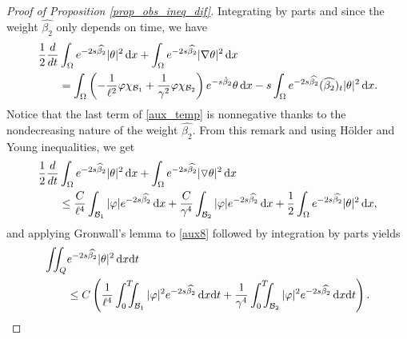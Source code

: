 \documentclass{dcds-bOF}
\theoremstyle{definition}
\newcommand\csin[1]{\chi_{#1}}
\def\dx{\,\textnormal{d}x}
\def\dt{\textnormal{d}t}
\begin{document}
\begin{proof}[Proof of Proposition \ref{prop_obs_ineq_dif}]
Integrating by parts and since the weight $\widehat{\beta_2}$ only depends on time, we have
%
\begin{equation}
\label{aux_temp}
\begin{split}
\frac12\frac{d}{dt}&\int_{\Omega}e^{-2s\widehat{\beta_2}}|\theta|^2\dx+\int_{\Omega}e^{-2s\widehat{\beta_2}}|\nabla \theta|^2\dx\\
&=\int_{\Omega}\left(-\frac{1}{\ell^2}\varphi\csin{\mathcal B_1}+\frac{1}{\gamma^2}\varphi \csin{\mathcal B_2}\right)e^{-s\hat{\beta}_2}\theta\dx-s\int_{\Omega}e^{-2s\widehat{\beta_2}}(\widehat{\beta_2})_t|\theta|^2\dx.
\end{split}
\end{equation}
%
 Notice that the last term of \eqref{aux_temp} is nonnegative thanks to the nondecreasing nature of the weight $\widehat{\beta_2}$. From this remark and using H\"older and Young inequalities, we get
 \begin{equation}
\label{aux8}
\begin{split}
\frac12\frac{d}{dt}&\int_{\Omega}e^{-2s\widehat{\beta}_2}|\theta|^2\dx+\int_{\Omega}e^{-2s\widehat{\beta_2}}|\triangledown \theta|^2\dx\\
&\leq \frac{C}{\ell^4}\int_{\mathcal B_1}|\varphi|e^{-2s\widehat{\beta_2}}\dx+\frac{C}{\gamma^4}\int_{\mathcal B_2}|\varphi|e^{-2s\widehat{\beta_2}}\dx+\frac12\int_{\Omega}e^{-2s\widehat{\beta_2}}|\theta|^2\dx,
\end{split}
\end{equation}
and applying Gronwall's lemma to \eqref{aux8} followed by integration by parts yields
 \begin{equation}\label{aux9}
 \begin{split}
\iint_Q &e^{-2s\widehat{\beta_2}}|\theta|^2\dx\dt\\
&\leq C\left(\frac{1}{\ell^4}\int_0^T\!\!\!\!\int_{\mathcal B_1}|\varphi|^2e^{-2s\widehat{\beta_2}}\dx\dt+\frac{1}{\gamma^4}\int_0^T\!\!\!\!\int_{\mathcal B_2}|\varphi|^2e^{-2s\widehat{\beta_2}}\dx\dt\right).
\end{split}
\end{equation}


\end{proof}
\end{document}
